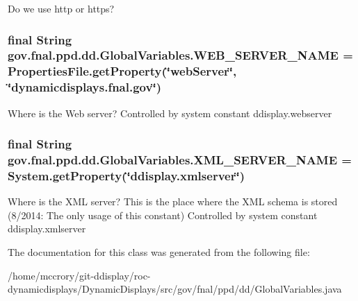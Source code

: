 Do we use http or https? \hypertarget{classgov_1_1fnal_1_1ppd_1_1dd_1_1GlobalVariables_af5ffb15826513fabba402ec017edbc70}{
\subsubsection[{W\-E\-B\-\_\-\-S\-E\-R\-V\-E\-R\-\_\-\-N\-A\-M\-E}]{\setlength{\rightskip}{0pt plus 5cm}final String gov.\-fnal.\-ppd.\-dd.\-Global\-Variables.\-W\-E\-B\-\_\-\-S\-E\-R\-V\-E\-R\-\_\-\-N\-A\-M\-E = Properties\-File.\-get\-Property(\char`\"{}web\-Server\char`\"{}, \char`\"{}dynamicdisplays.\-fnal.\-gov\char`\"{})\hspace{0.3cm}{\ttfamily [static]}}}\label{classgov_1_1fnal_1_1ppd_1_1dd_1_1GlobalVariables_af5ffb15826513fabba402ec017edbc70}
Where is the Web server? Controlled by system constant ddisplay.\-webserver \hypertarget{classgov_1_1fnal_1_1ppd_1_1dd_1_1GlobalVariables_a1b1eb1c9096380d09b968cd474e8bb86}{
\subsubsection[{X\-M\-L\-\_\-\-S\-E\-R\-V\-E\-R\-\_\-\-N\-A\-M\-E}]{\setlength{\rightskip}{0pt plus 5cm}final String gov.\-fnal.\-ppd.\-dd.\-Global\-Variables.\-X\-M\-L\-\_\-\-S\-E\-R\-V\-E\-R\-\_\-\-N\-A\-M\-E = System.\-get\-Property(\char`\"{}ddisplay.\-xmlserver\char`\"{})\hspace{0.3cm}{\ttfamily [static]}}}\label{classgov_1_1fnal_1_1ppd_1_1dd_1_1GlobalVariables_a1b1eb1c9096380d09b968cd474e8bb86}
Where is the X\-M\-L server? This is the place where the X\-M\-L schema is stored (8/2014\-: The only usage of this constant) Controlled by system constant ddisplay.\-xmlserver 

The documentation for this class was generated from the following file\-:\begin{DoxyCompactItemize}
\item 
/home/mccrory/git-\/ddisplay/roc-\/dynamicdisplays/\-Dynamic\-Displays/src/gov/fnal/ppd/dd/Global\-Variables.\-java\end{DoxyCompactItemize}
